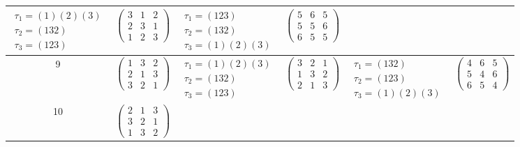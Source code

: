 \begin{longtable}{|c|p{2.7cm}|p{2.5cm}|p{2.7cm}|p{2.5cm}|p{2.7cm}|}
    $\begin{array}{l}\tau_1=(1)(2)(3)\\ \tau_2=(132)\\ \tau_3=(123)\end{array}$ &
    $\begin{pmatrix}3&1&2\\2&3&1\\1&2&3\end{pmatrix}$                           &
    $\begin{array}{l}\tau_1=(123)\\ \tau_2=(132)\\ \tau_3=(1)(2)(3)\end{array}$ &
    $\begin{pmatrix}5&6&5\\5&5&6\\6&5&5\end{pmatrix}$                                                                                                       \\
    \hline
    9                                                                           &
    $\begin{pmatrix}1&3&2\\2&1&3\\3&2&1\end{pmatrix}$                           &
    $\begin{array}{l}\tau_1=(1)(2)(3)\\ \tau_2=(132)\\ \tau_3=(123)\end{array}$ &
    $\begin{pmatrix}3&2&1\\1&3&2\\2&1&3\end{pmatrix}$                           &
    $\begin{array}{l}\tau_1=(132)\\ \tau_2=(123)\\ \tau_3=(1)(2)(3)\end{array}$ &
    $\begin{pmatrix}4&6&5\\5&4&6\\6&5&4\end{pmatrix}$                                                                                                       \\
    \hline
    10                                                                          &
    $\begin{pmatrix}2&1&3\\3&2&1\\1&3&2\end{pmatrix}$                           &

\end{longtable}
